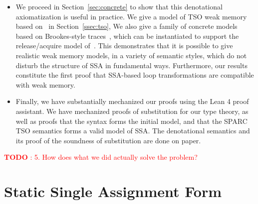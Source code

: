 \documentclass[acmsmall,screen,review]{acmart}
\newcounter{todos}
\newcommand{\todo}[1]{\stepcounter{todos} \textcolor{red}{\textbf{TODO \arabic{todos}}: #1}}
\newcommand{\ms}[1]{\ensuremath{\mathsf{#1}}}
\newcommand{\isotopessa}{\(\lambda_{\ms{SSA}}\)}
\begin{document}
\begin{itemize}
\item We proceed in Section~\ref{sec:concrete} to show that this
  denotational axiomatization is useful in practice. We give a model
  of TSO weak memory based on~\citet{sparky} in
  Section~\ref{ssec:tso}, We also give a family of concrete models
  based on Brookes-style traces~\cite{brookes-full-abstraction-96}, which can be
  instantiated to support the release/acquire model
  of~\citet{release-acquire}. This demonstrates that it is possible to
  give realistic weak memory models, in a variety of semantic styles,
  which do not disturb the structure of SSA in fundamental ways.
  Furthermore, our results constitute the first proof that SSA-based loop transformations
  are compatible with weak memory. 

\item Finally, we have substantially mechanized our proofs using the Lean 4 proof assistant. We have
  mechanized proofs of substitution for our type theory, as well as proofs that the syntax forms the
  initial model, and that the SPARC TSO semantics forms a valid model of SSA. The denotational
  semantics and its proof of the soundness of substitution are done on paper. 
\end{itemize}


\todo{5. How does what we did actually solve the problem?}

\section{Static Single Assignment Form}

\end{document}
